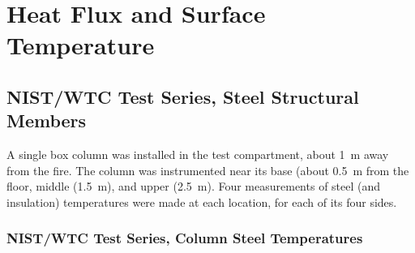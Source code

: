 \chapter{Heat Flux and Surface Temperature}



\clearpage

\section{NIST/WTC Test Series, Steel Structural Members}

A single box column was installed in the test compartment, about 1~m away from the fire. The column was instrumented near its base (about
0.5~m from the floor, middle (1.5~m), and upper (2.5~m). Four measurements of steel (and insulation) temperatures were made at each location, for
each of its four sides.

\clearpage

\subsection{NIST/WTC Test Series, Column Steel Temperatures}

\vspace{1in}

